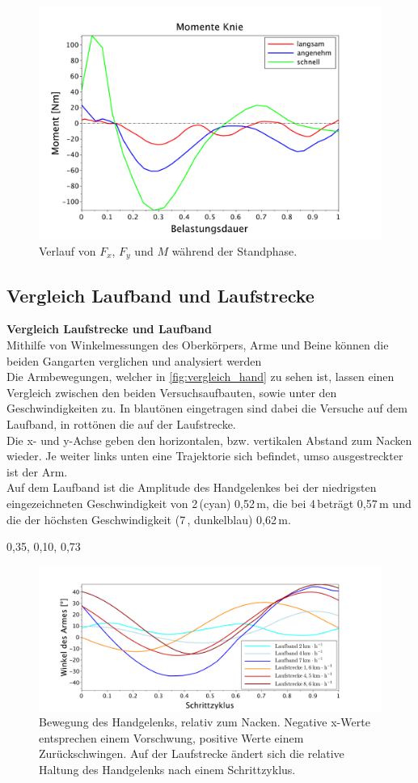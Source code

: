 \begin{figure}[h!]
	\centering
	\includegraphics[width=0.7\linewidth]{bilder/ergebnisse/momente_knie.pdf}
	\caption[Bodenreaktionskräfte]{Verlauf von $F_x$, $F_y$ und $M$ während der Standphase.}
	\label{fig:knee_m}
\end{figure}


\subsection{Vergleich Laufband und Laufstrecke}
\textbf{Vergleich Laufstrecke und Laufband}\\
Mithilfe von Winkelmessungen des Oberkörpers, Arme und Beine können die beiden Gangarten verglichen und analysiert werden\\
Die Armbewegungen, welcher in \autoref{fig:vergleich_hand} zu sehen ist, lassen einen Vergleich zwischen den beiden Versuchsaufbauten, sowie unter den Geschwindigkeiten zu. In blautönen eingetragen sind dabei die Versuche auf dem Laufband, in rottönen die auf der Laufstrecke. \\
Die x- und y-Achse geben den horizontalen, bzw. vertikalen Abstand zum Nacken wieder. Je weiter links unten eine Trajektorie sich befindet, umso ausgestreckter ist der Arm.\\
Auf dem Laufband ist die Amplitude des Handgelenkes bei der niedrigsten eingezeichneten Geschwindigkeit von 2\,\kmh (cyan) 0,52\,m, die bei 4\,\kmh beträgt 0,57\,m und die der höchsten Geschwindigkeit (7\,\kmh, dunkelblau) 0,62\,m. 

0,35, 0,10, 0,73


\begin{figure}[h!]
	\centering
	\includegraphics[width=1\linewidth]{bilder/ergebnisse/armschwung_winkel.pdf}
	\caption[Handtrajektorie]{Bewegung des Handgelenks, relativ zum Nacken. Negative x-Werte entsprechen einem Vorschwung, positive Werte einem Zurückschwingen. Auf der Laufstrecke ändert sich die relative Haltung des Handgelenks nach einem Schrittzyklus.}
	\label{fig:vergleich_hand}
\end{figure}

